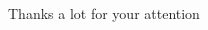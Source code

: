 %
%
%


\STANDARD{}
{
  \begin{columns}
    \begin{column}{0.35\textwidth}
      \begin{block}{~~~~~~Thanks a lot}
        \centering
        for your attention
      \end{block}
    \end{column}
  \end{columns}
}


